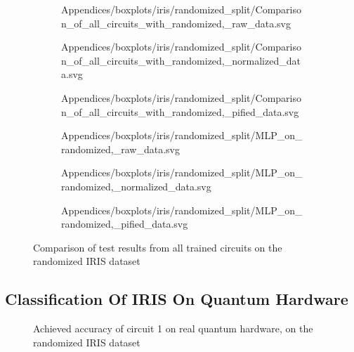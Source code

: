 \begin{figure}[!h]
    \begin{subfigure}{.5\textwidth}
        \centering
        
        {Appendices/boxplots/iris/randomized_split/Comparison_of_all_circuits_with_randomized,_raw_data.svg}
    \end{subfigure}
    \begin{subfigure}{.5\textwidth}
        \centering
        
        {Appendices/boxplots/iris/randomized_split/Comparison_of_all_circuits_with_randomized,_normalized_data.svg}
    \end{subfigure}
    \begin{subfigure}{.5\textwidth}
        \centering
        
        {Appendices/boxplots/iris/randomized_split/Comparison_of_all_circuits_with_randomized,_pified_data.svg}
    \end{subfigure}
    \begin{subfigure}{.5\textwidth}
        \centering
        
        {Appendices/boxplots/iris/randomized_split/MLP_on_randomized,_raw_data.svg}
    \end{subfigure}
    \begin{subfigure}{.5\textwidth}
        \centering
        
        {Appendices/boxplots/iris/randomized_split/MLP_on_randomized,_normalized_data.svg}
    \end{subfigure}
    \begin{subfigure}{.5\textwidth}
        \centering
        
        {Appendices/boxplots/iris/randomized_split/MLP_on_randomized,_pified_data.svg}
    \end{subfigure}
    \caption{Comparison of test results from all trained circuits on the randomized IRIS dataset}
    \label{fig:circuits_results_r_iris}
\end{figure}

\clearpage
\subsection{Classification Of IRIS On Quantum Hardware}

\begin{figure}[!h]
    \centering
    
    \caption{Achieved accuracy of circuit 1 on real quantum hardware, on the randomized IRIS dataset}
    \label{fig:boxplot_real_hardware}
\end{figure}

